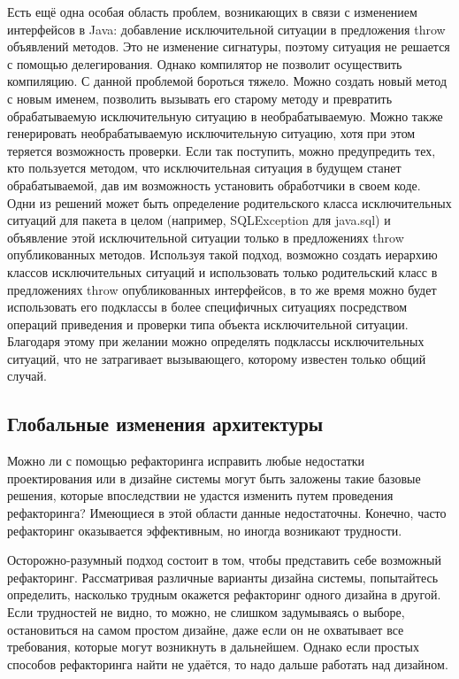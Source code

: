 \documentclass{../../text-style}
\begin{document}
Есть ещё одна особая область проблем, возникающих в связи с изменением интерфейсов в Java: добавление исключительной ситуации в предложения throw объявлений методов. Это не изменение сигнатуры, поэтому ситуация не решается с помощью делегирования. Однако компилятор не позволит осуществить компиляцию. С данной проблемой бороться тяжело. Можно создать новый метод с новым именем, позволить вызывать его старому методу и превратить обрабатываемую исключительную ситуацию в необрабатываемую. Можно также генерировать необрабатываемую исключительную ситуацию, хотя при этом теряется возможность проверки. Если так поступить, можно предупредить тех, кто пользуется методом, что исключительная ситуация в будущем станет обрабатываемой, дав им возможность установить обработчики в своем коде. Одни из решений может быть определение родительского класса исключительных ситуаций для пакета в целом (например, SQLException для java.sql) и объявление этой исключительной ситуации только в предложениях throw опубликованных методов. Используя такой подход, возможно создать иерархию классов исключительных ситуаций и использовать только родительский класс в предложениях throw опубликованных интерфейсов, в то же время можно будет использовать его подклассы в более специфичных ситуациях посредством операций приведения и проверки типа объекта исключительной ситуации. Благодаря этому при желании можно определять подклассы исключительных ситуаций, что не затрагивает вызывающего, которому известен только общий случай.

\subsection{Глобальные изменения архитектуры}

Можно ли с помощью рефакторинга исправить любые недостатки проектирования или в дизайне системы могут быть заложены такие базовые решения, которые впоследствии не удастся изменить путем проведения рефакторинга? Имеющиеся в этой области данные недостаточны. Конечно, часто рефакторинг оказывается эффективным, но иногда возникают трудности.

Осторожно-разумный подход состоит в том, чтобы представить себе возможный рефакторинг. Рассматривая различные варианты дизайна системы, попытайтесь определить, насколько трудным окажется рефакторинг одного дизайна в другой. Если трудностей не видно, то можно, не слишком задумываясь о выборе, остановиться на самом простом дизайне, даже если он не охватывает все требования, которые могут возникнуть в дальнейшем. Однако если простых способов рефакторинга найти не удаётся, то надо дальше работать над дизайном.
\end{document}
